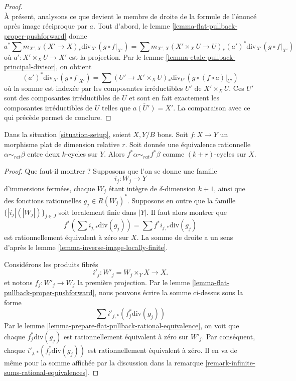 \begin{proof}
$$$$
À présent, analysons ce que devient le membre de droite de la formule de
l'énoncé après image réciproque par $a$. Tout d'abord, le lemme
\ref{lemma-flat-pullback-proper-pushforward} donne
$$
a^*\sum m_{X', X} (X' \to X)_*\text{div}_{X'}(g \circ f|_{X'}) =
\sum m_{X', X} (X' \times_X U \to U)_*(a')^*\text{div}_{X'}(g \circ f|_{X'})
$$
où $a' : X' \times_X U \to X'$ est la projection. Par le lemme
\ref{lemma-etale-pullback-principal-divisor}, on obtient
$$
(a')^*\text{div}_{X'}(g \circ f|_{X'}) =
\sum (U' \to X' \times_X U)_*\text{div}_{U'}(g \circ (f \circ a)|_{U'})
$$
où la somme est indexée par les composantes irréductibles $U'$ de $X' \times_X U$. Ces
$U'$ sont des composantes irréductibles de $U$ et sont en fait exactement les
composantes irréductibles de $U$ telles que $\overline{a(U')} = X'$. La comparaison
avec ce qui précède permet de conclure.
\end{proof}

\begin{lemma}
\label{lemma-flat-pullback-rational-equivalence}
Dans la situation \ref{situation-setup}, soient $X, Y/B$ bons. Soit $f :
X \to Y$ un morphisme plat de dimension relative $r$. Soit donnée une
équivalence rationnelle $\alpha \sim_{rat} \beta$ entre deux $k$-cycles sur
$Y$. Alors $f^*\alpha
\sim_{rat} f^*\beta$ comme $(k + r)$-cycles sur $X$.
\end{lemma}

\begin{proof}
Que faut-il montrer ? Supposons que l'on se donne une famille
$$
i_j : W_j \longrightarrow Y
$$
d'immersions fermées, chaque $W_j$ étant intègre de $\delta$-dimension $k +
1$, ainsi que des fonctions rationnelles $g_j \in R(W_j)^*$. Supposons en outre que la
famille $\{|i_j|(|W_j|)\}_{j \in J}$ soit localement finie dans $|Y|$. Il
faut alors montrer que
$$
f^*(\sum i_{j, *}\text{div}(g_j)) = \sum f^*i_{j, *}\text{div}(g_j)
$$
est rationnellement équivalent à zéro sur $X$. La somme de droite a un sens
d'après le lemme \ref{lemma-inverse-image-locally-finite}.

\medskip\noindent
Considérons les produits fibrés
$$
i'_j : W'_j = W_j \times_Y X \longrightarrow X.
$$
et notons $f_j : W'_j \to W_j$ la première projection. Par le lemme
\ref{lemma-flat-pullback-proper-pushforward}, nous pouvons écrire la somme
ci-dessus sous la forme
$$
\sum i'_{j, *}(f_j^*\text{div}(g_j))
$$
Par le lemme \ref{lemma-prepare-flat-pullback-rational-equivalence}, on voit
que chaque $f_j^*\text{div}(g_j)$ est rationnellement équivalent à zéro sur
$W'_j$. Par conséquent, chaque $i'_{j, *}(f_j^*\text{div}(g_j))$ est
rationnellement équivalent à zéro. Il en va de même pour la somme affichée par
la discussion dans la remarque
\ref{remark-infinite-sums-rational-equivalences}.
\end{proof}

